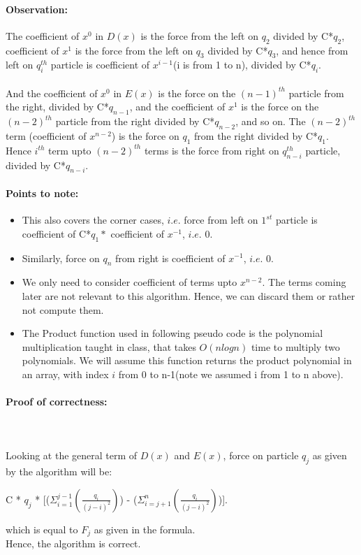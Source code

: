 \documentclass[pdftex,a4paper,12pt]{report}
\begin{document}
\newpage

\paragraph{Observation:}

The coefficient of $x^0$ in $D(x)$ is the force from the left on $q_2$ divided by C*$q_2$, coefficient of $x^1$ is the force from the
left on $q_3$ divided by C*$q_3$, and hence from left on $q_{i}^{th}$ particle is coefficient of $x^{i-1}$(i is from 1 to n), divided by C*$q_i$.\\\\
And the coefficient of $x^0$ in $E(x)$ is the force on the $(n-1)^{th}$ particle from the right, divided by C*$q_{n-1}$, 
and the coefficient of $x^1$ is the force on the $(n-2)^{th}$ particle from the right divided by C*$q_{n-2}$, and so on. 
The $(n-2)^{th}$ term (coefficient of $x^{n-2}$) is the force on $q_1$ from the right divided by C*$q_{1}$. 
Hence $i^{th}$ term upto $(n-2)^{th}$ terms is the force from right on $q_{n-i}^{th}$ particle, divided by C*$q_{n-i}$.\\

\paragraph{Points to note:}
\begin{itemize}
 \item 
 This also covers the corner cases, $i.e.$ force from left on $1^{st}$ particle is coefficient of C*$q_1*$ coefficient of $x^{-1}$, $i.e.$ 0.
 \item
 Similarly, force on $q_n$ from right is coefficient of $x^{-1}$, $i.e.$ 0.
 \item
 We only need to consider coefficient of terms upto $x^{n-2}$. The terms coming later are not relevant to this algorithm. 
 Hence, we can discard them or rather not compute them.
 \item
 The Product function used in following pseudo code is the polynomial multiplication taught in class, that takes $O(n log n)$ time to multiply 
 two polynomials. We will assume this function returns the product polynomial in an array, with index $i$ from 0 to n-1(note we assumed i from 1 to n above).
\end{itemize}

\paragraph{Proof of correctness:} \makebox[2pt]{}\\\\
Looking at the general term of $D(x)$ and $E(x)$, force on particle $q_j$ as given by the algorithm will be:
\begin{center}
 C * $q_j$ * [($\Sigma_{i=1}^{j-1} (\frac{q_i}{(j-i)^2})$) - ($\Sigma_{i=j+1}^{n} (\frac{q_i}{(j-i)^2})$)].
\end{center}
which is equal to $F_j$ as given in the formula.\\
Hence, the algorithm is correct.
\end{document}
